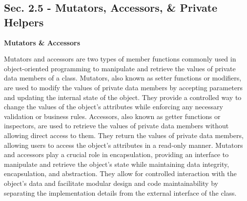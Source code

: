 \subsection*{Sec. 2.5 - Mutators, Accessors, \& Private Helpers}
\noindent \textbf{Mutators \& Accessors}

Mutators and accessors are two types of member functions commonly used in object-oriented programming to manipulate and retrieve the values of private data members of a class. Mutators, also known as setter functions or 
modifiers, are used to modify the values of private data members by accepting parameters and updating the internal state of the object. They provide a controlled way to change the values of the object's attributes while 
enforcing any necessary validation or business rules. Accessors, also known as getter functions or inspectors, are used to retrieve the values of private data members without allowing direct access to them. They return 
the values of private data members, allowing users to access the object's attributes in a read-only manner. Mutators and accessors play a crucial role in encapsulation, providing an interface to manipulate and retrieve 
the object's state while maintaining data integrity, encapsulation, and abstraction. They allow for controlled interaction with the object's data and facilitate modular design and code maintainability by separating the 
implementation details from the external interface of the class. \\

